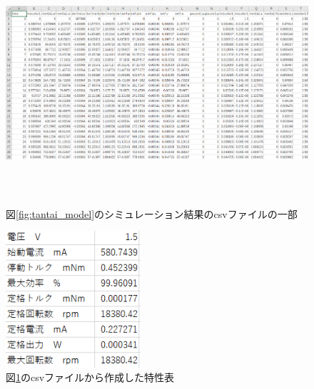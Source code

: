   \begin{figure}[t]
	\centering
	\includegraphics[width=16.5cm,height=9cm]{./Image/simyu_csv.png}
	\caption{図\ref{fig:tantai_model}のシミュレーション結果のcsvファイルの一部}
	\label{fig:simyu_csv}
  \end{figure}

  \begin{figure}[t]
	\centering
	\includegraphics[width=5cm]{./Image/chara_table.png}
	\caption{図\ref{fig:simyu_csv}のcsvファイルから作成した特性表}
	\label{fig:tokuseihyou}
  \end{figure}
